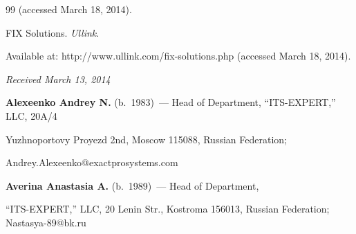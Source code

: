 {{\begin{thebibliography}{99}
(accessed March 18, 2014).







FIX Solutions. \textit{Ullink}.


Available at: {\sf http://www.ullink.com/fix-solutions.php} (accessed March 18, 2014).











\end{thebibliography}


} }





\vspace*{-6pt}





\hfill{\small\textit{Received March 13, 2014}}





\vspace*{-6pt}








\Contr





\noindent


\textbf{Alexeenko Andrey N.} (b.\ 1983)~--- Head of Department, ``ITS-EXPERT,'' LLC, 20A/4


Yuzhnoportovy Proyezd 2nd,  Moscow 115088, Russian Federation;


Andrey.Alexeenko@exactprosystems.com





\vspace*{3pt}





\noindent


  \textbf{Averina Anastasia A.} (b.\ 1989)~--- Head of Department,


  ``ITS-EXPERT,'' LLC, 20 Lenin Str., Kostroma 156013, Russian Federation; Nastasya-89@bk.ru





  \vspace*{3pt}





